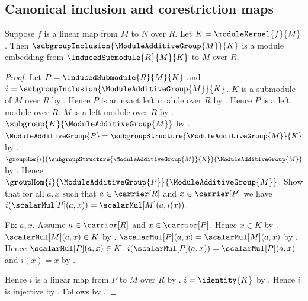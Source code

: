 \subsection{Canonical inclusion and corestriction maps}

\begin{theorem}\label{module_kernel_inclusion_is_embedding}
    Suppose $f$ is a linear map from $M$ to $N$ over $R$.
    Let $K=\moduleKernel{f}{M}$.
    Then $\subgroupInclusion{\ModuleAdditiveGroup{M}}{K}$ is a module
        embedding from $\InducedSubmodule{R}{M}{K}$ to $M$ over $R$.
\end{theorem}
\begin{proof}
    Let $P=\InducedSubmodule{R}{M}{K}$ and
        $i=\subgroupInclusion{\ModuleAdditiveGroup{M}}{K}$.
    $K$ is a submodule of $M$ over $R$ by
        .
    Hence $P$ is an exact left module over $R$ by
        .
    Hence $P$ is a left module over $R$.
    $M$ is a left module over $R$ by
        .
    $\subgroup{K}{\ModuleAdditiveGroup{M}}$ by
        .
    $\ModuleAdditiveGroup{P}
        =\subgroupStructure{\ModuleAdditiveGroup{M}}{K}$ by
        .
    $\groupHom{i}{
        \subgroupStructure{\ModuleAdditiveGroup{M}}{K}}{
        \ModuleAdditiveGroup{M}}$ by
        .
    Hence $\groupHom{i}{\ModuleAdditiveGroup{P}}{
        \ModuleAdditiveGroup{M}}$.
    Show that for all $a,x$ such that $a\in\carrier[R]$ and
        $x\in\carrier[P]$ we have
        $i(\scalarMul[P](a,x))=\scalarMul[M](a,i(x))$.
    \begin{subproof}
        Fix $a,x$.
        Assume $a\in\carrier[R]$ and $x\in\carrier[P]$.
        Hence $x\in K$ by .
        $\scalarMul[M](a,x)\in K$ by .
        $\scalarMul[P](a,x)=\scalarMul[M](a,x)$ by
            .
        Hence $\scalarMul[P](a,x)\in K$.
        $i(\scalarMul[P](a,x))=\scalarMul[P](a,x)$ and
            $i(x)=x$ by .
    \end{subproof}
    Hence $i$ is a linear map from $P$ to $M$ over $R$ by
        .
    $i=\identity{K}$ by .
    Hence $i$ is injective by .
    Follows by .
\end{proof}

